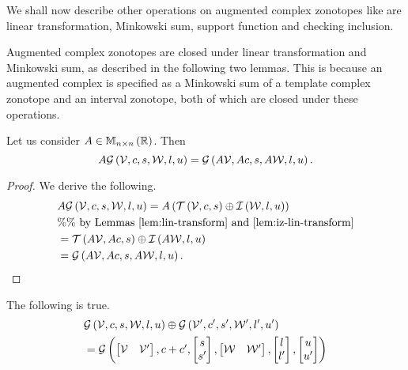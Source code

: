 We shall now describe other operations on augmented complex zonotopes
like are linear transformation, Minkowski sum, support function and
checking inclusion.

Augmented complex zonotopes are closed under linear transformation and
Minkowski sum, as described in the following two lemmas.  This
is because an augmented complex is specified as a Minkowski sum of a template
complex zonotope and an interval zonotope, both of which are closed
under these operations.
%
\begin{lemma}
Let us consider $A\in\mathbb{M}_{n\times n}\left(\mathbb{R}\right)$.  Then
%
\[
A\mathcal{G}\left(\mathcal{V},c,s,\mathcal{W},l,u\right)=\mathcal{G}\left(A\mathcal{V},Ac,s,A\mathcal{W},l,u\right).
\]
%
\end{lemma}
%
\begin{proof}
  We derive the following.
  \begin{align*}
    & A\mathcal{G}\left(\mathcal{V},c,s,\mathcal{W},l,u\right)=
    A\left(\mathit{\operatorname{\mathcal{T}}}\left(\mathcal{V},c,s\right)\oplus \mathit{\operatorname{\mathcal{I}}}\left(\mathcal{W},l,u\right)\right)\\
    & \%\%~\text{by Lemmas~\ref{lem:lin-transform} and~\ref{lem:iz-lin-transform}}\\
    &
    = \mathit{\operatorname{\mathcal{T}}}\left(A\mathcal{V},Ac,s\right)\oplus \mathit{\operatorname{\mathcal{I}}}\left(A\mathcal{W},l,u\right)\\
    & = \mathcal{G}\left(A\mathcal{V},Ac,s,A\mathcal{W},l,u\right).~~~~~~~~~~~~~\qedhere
  \end{align*}
\end{proof}
%
\begin{lemma}
The following is true.
%
\begin{align*}
& \mathcal{G}\left(\mathcal{V},c,s,\mathcal{W},l,u\right)\oplus \mathcal{G}\left(\mathcal{V}^\prime,c^\prime,s^\prime,\mathcal{W}^\prime,l^\prime,u^\prime\right)\\
& = \mathcal{G}\left(\left[\begin{matrix}
    \mathcal{V} &
    \mathcal{V}^\prime
  \end{matrix}\right]
,\begin{matrix}
    c+c^\prime
  \end{matrix}
,\left[\begin{matrix}
    s\\
    s^\prime
  \end{matrix}\right]
,\left[\begin{matrix}
    \mathcal{W} &
    \mathcal{W}^\prime
  \end{matrix}\right]
,\left[\begin{matrix}
    l\\
    l^\prime
  \end{matrix}\right]
,\left[\begin{matrix}
    u\\
    u^\prime
  \end{matrix}\right]
\right)
\end{align*}
%
\end{lemma}
